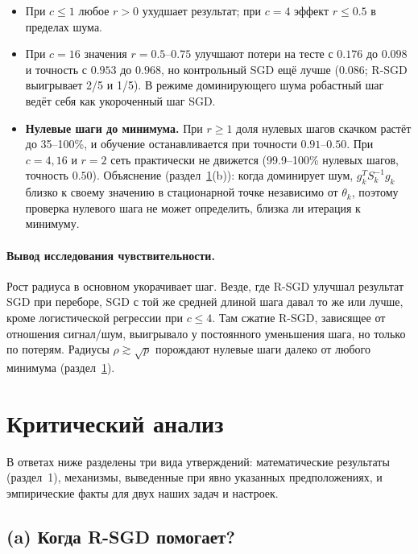 \documentclass[11pt,a4paper]{article}
\begin{document}
\begin{itemize}
\item При $c\le1$ любое $r>0$ ухудшает результат; при $c=4$ эффект $r\le0.5$ в пределах шума.
\item При $c=16$ значения $r=0.5$--$0.75$ улучшают потери на тесте с $0.176$ до $0.098$ и
точность с $0.953$ до $0.968$, но контрольный SGD ещё лучше ($0.086$; R-SGD выигрывает 2/5 и
1/5). В режиме доминирующего шума робастный шаг ведёт себя как укороченный шаг SGD.
\item \textbf{Нулевые шаги до минимума.} При $r\ge1$ доля нулевых шагов скачком растёт до
35--100\%, и обучение останавливается при точности $0.91$--$0.50$. При $c=4,16$ и $r=2$ сеть
практически не движется (99.9--100\% нулевых шагов, точность $0.50$). Объяснение (раздел~\ref{sec:critical}(b)): когда
доминирует шум, $g_k^TS_k^{-1}g_k$ близко к своему значению в стационарной точке независимо от
$\theta_k$, поэтому проверка нулевого шага не может определить, близка ли итерация к минимуму.
\end{itemize}

\paragraph{Вывод исследования чувствительности.} Рост радиуса в основном укорачивает шаг. Везде,
где R-SGD улучшал результат SGD при переборе, SGD с той же средней длиной шага давал то же или
лучше, кроме логистической регрессии при $c\le4$. Там сжатие R-SGD, зависящее от отношения
сигнал/шум, выигрывало у постоянного уменьшения шага, но только по потерям. Радиусы
$\rho\gtrsim\sqrt p$ порождают нулевые шаги далеко от любого минимума (раздел~\ref{sec:critical}).


\section{Критический анализ}\label{sec:critical}

В ответах ниже разделены три вида утверждений: математические результаты (раздел~1), механизмы,
выведенные при явно указанных предположениях, и эмпирические факты для двух наших задач и
настроек.

\subsection{(a) Когда R-SGD помогает?}
\end{document}
